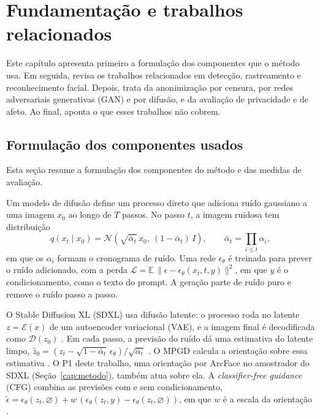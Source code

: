 \chapter{Fundamentação e trabalhos relacionados}
\label{cap:fundam}


Este capítulo apresenta primeiro a formulação dos componentes que o método usa.
Em seguida, revisa os trabalhos relacionados em detecção, rastreamento e reconhecimento facial.
Depois, trata da anonimização por censura, por redes adversariais generativas (GAN) e por difusão, e da avaliação de privacidade e de afeto.
Ao final, aponta o que esses trabalhos não cobrem.

\section{Formulação dos componentes usados}
\label{sec:formulacao}

Esta seção resume a formulação dos componentes do método e das medidas de avaliação.

Um modelo de difusão \citep{ddpm} define um processo direto que adiciona ruído gaussiano a uma imagem $x_0$ ao longo de $T$ passos.
No passo $t$, a imagem ruidosa tem distribuição
\begin{equation}
q(x_t \mid x_0) = \mathcal{N}\!\left(\sqrt{\bar\alpha_t}\,x_0,\ (1-\bar\alpha_t)\,I\right),\qquad \bar\alpha_t = \textstyle\prod_{i\le t}\alpha_i,
\end{equation}
em que os $\alpha_i$ formam o cronograma de ruído.
Uma rede $\epsilon_\theta$ é treinada para prever o ruído adicionado, com a perda $\mathcal{L} = \mathbb{E}\,\lVert \epsilon - \epsilon_\theta(x_t, t, y)\rVert^2$, em que $y$ é o condicionamento, como o texto do prompt.
A geração parte de ruído puro e remove o ruído passo a passo.

O Stable Diffusion XL (SDXL) usa difusão latente: o processo roda no latente $z = \mathcal{E}(x)$ de um autoencoder variacional (VAE), e a imagem final é decodificada como $\mathcal{D}(z_0)$ \citep{sdxl}.
Em cada passo, a previsão do ruído dá uma estimativa do latente limpo, $\hat z_0 = (z_t - \sqrt{1-\bar\alpha_t}\,\epsilon_\theta)/\sqrt{\bar\alpha_t}$ \citep{ddpm}.
O MPGD calcula a orientação sobre essa estimativa \citep{mpgd}.
O P1 deste trabalho, uma orientação por ArcFace no amostrador do SDXL (Seção~\ref{cap:metodo}), também atua sobre ela.
A \emph{classifier-free guidance} (CFG) combina as previsões com e sem condicionamento, $\tilde\epsilon = \epsilon_\theta(z_t,\varnothing) + w\,(\epsilon_\theta(z_t,y) - \epsilon_\theta(z_t,\varnothing))$, em que $w$ é a escala da orientação \citep{cfg}.

